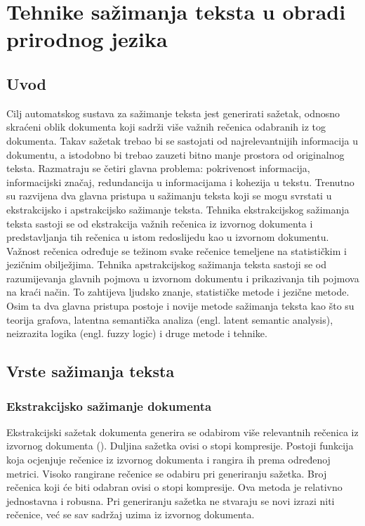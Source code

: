 \documentclass[times, utf8, zavrsni, numeric]{fer}
\begin{document}
\chapter{Tehnike sažimanja teksta u obradi prirodnog jezika}
\section{Uvod}
Cilj automatskog sustava za sažimanje teksta jest generirati sažetak, odnosno skraćeni oblik dokumenta koji sadrži više važnih rečenica odabranih iz tog dokumenta.
Takav sažetak trebao bi se sastojati od najrelevantnijih informacija u dokumentu, a istodobno bi trebao zauzeti bitno manje prostora od originalnog teksta.
Razmatraju se četiri glavna problema: pokrivenost informacija, informacijski značaj, redundancija u informacijama i kohezija u tekstu.
Trenutno su razvijena dva glavna pristupa u sažimanju teksta koji se mogu svrstati u ekstrakcijsko i apstrakcijsko sažimanje teksta.
Tehnika ekstrakcijskog sažimanja teksta sastoji se od ekstrakcija važnih rečenica iz izvornog dokumenta i predstavljanja tih rečenica u istom redoslijedu kao u izvornom dokumentu.
Važnost rečenica određuje se težinom svake rečenice temeljene na statističkim i jezičnim obilježjima.
Tehnika apstrakcijskog sažimanja teksta sastoji se od razumijevanja glavnih pojmova u izvornom dokumentu i prikazivanja tih pojmova na kraći način.
To zahtijeva ljudsko znanje, statističke metode i jezične metode.
Osim ta dva glavna pristupa postoje i novije metode sažimanja teksta kao što su teorija grafova, latentna semantička analiza (engl. latent semantic analysis), neizrazita logika (engl. fuzzy logic) i druge metode i tehnike.
\section{Vrste sažimanja teksta}
\subsection{Ekstrakcijsko sažimanje dokumenta}
Ekstrakcijski sažetak dokumenta generira se odabirom više relevantnih rečenica iz izvornog dokumenta (\citet{article1}). Duljina sažetka ovisi o stopi kompresije.
Postoji funkcija koja ocjenjuje rečenice iz izvornog dokumenta i rangira ih prema određenoj metrici. Visoko rangirane rečenice se odabiru pri generiranju sažetka. Broj rečenica koji će biti odabran ovisi o stopi kompresije.
Ova metoda je relativno jednostavna i robusna.
Pri generiranju sažetka ne stvaraju se novi izrazi niti rečenice, već se sav sadržaj uzima iz izvornog dokumenta.
\end{document}
